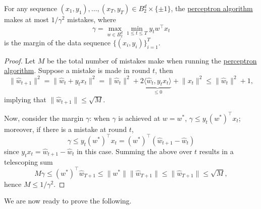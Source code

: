 \begin{lemma}\label{lma:perceptron-mistake-bound}
	For any sequence \((x_1, y_1), \ldots, (x_T, y_T) \in B_2^d \times \{\pm 1\}\), the \hyperref[algo:perceptron]{perceptron algorithm} makes at most \(1/\gamma^2\) mistakes, where
	\[
		\gamma = \max_{w \in B_2^d} \min_{1 \leq t \leq T} y_t w^{\top} x_t
	\]
	is the margin of the data sequence \(\{ (x_i, y_i) \} _{i = 1}^T\).
\end{lemma}
\begin{proof}
	Let \(M\) be the total number of mistakes make when running the \hyperref[algo:perceptron]{perceptron algorithm}. Suppose a mistake is made in round \(t\), then
	\[
		\lVert \hat{w}_{t+1} \rVert ^2
		= \lVert \hat{w}_t +y_t x_t \rVert ^2
		= \lVert \hat{w} _t \rVert ^2 + 2 \underbrace{\langle \hat{w} _t, y_t x_t \rangle}_{\leq 0} + \lVert x_t \rVert ^2
		\leq \lVert \hat{w}_t \rVert ^2 + 1,
	\]
	implying that \(\lVert \hat{w}_{t+1} \rVert \leq \sqrt{M}\).

	Now, consider the margin \(\gamma\): when \(\gamma \) is achieved at \(w = w^{\ast} \), \(\gamma \leq y_t (w^{\ast})^{\top} x_t\); moreover, if there is a mistake at round \(t\),
	\[
		\gamma
		\leq y_t (w^{\ast})^{\top} x_t
		= (w^{\ast})^{\top} (\hat{w}_{t+1} -\hat{w}_t)
	\]
	since \(y_t x_t = \hat{w} _{t+1} - \hat{w} _t\) in this case. Summing the above over \(t\) results in a telescoping sum
	\[
		M \gamma \leq (w^{\ast})^{\top} \hat{w}_{T+1}
		\leq \lVert w^{\ast} \rVert \lVert \hat{w}_{T+1} \rVert
		\leq \lVert \hat{w}_{T+1} \rVert
		\leq \sqrt{M},
	\]
	hence \(M \leq 1 / \gamma ^2\).
\end{proof}

We are now ready to prove the following.

